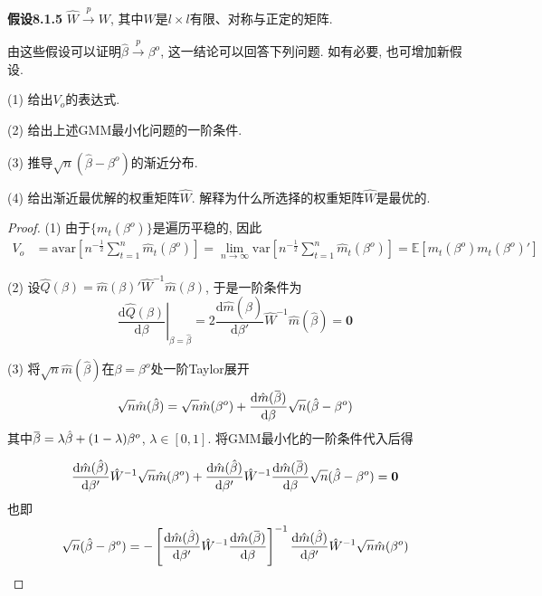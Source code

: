 \documentclass[cn,12pt,math=mtpro2,citestyle=gb7714-2015,bibstyle=gb7714-2015,twocol,mode=simple]{elegantbook}
\newcommand{\overbar}[1]{\mkern 1.5mu\overline{\mkern-1.5mu#1\mkern-1.5mu}\mkern 1.5mu}
\newcommand{\E}{\mathbb{E}}
\newcommand{\var}{\text{var}}
\newcommand{\hbeta}{\hat{\beta}}
\newcommand{\hatm}{\hat{m}}
\begin{document}
\textbf{假设8.1.5} $\hat{W}\xrightarrow{p} W$, 其中$W$是$l\times l$有限、对称与正定的矩阵.

由这些假设可以证明$\hat{\beta}\xrightarrow{p}\beta^o$, 这一结论可以回答下列问题. 如有必要, 也可增加新假设.

(1) 给出$V_o$的表达式.

(2) 给出上述GMM最小化问题的一阶条件.

(3) 推导$\sqrt{n}(\hat{\beta}-\beta^o)$的渐近分布.

(4) 给出渐近最优解的权重矩阵$\hat{W}$. 解释为什么所选择的权重矩阵$\hat{W}$是最优的.

\begin{proof}
  (1) 由于$\{m_t(\beta^o)\}$是遍历平稳的, 因此
  \begin{align*}
  V_o&=\text{avar}\left[n^{-\frac{1}{2}}\sum_{t=1}^{n}\hatm_t(\beta^o)\right]=\lim_{n\to\infty}\var\left[n^{-\frac{1}{2}}\sum_{t=1}^{n} \hatm_t(\beta^o)\right]=\E[m_t(\beta^o)m_t(\beta^o)']
  \end{align*}

  (2) 设$\hat{Q}(\beta)=\hat{m}(\beta)'\hat{W}^{-1}\hat{m}(\beta)$, 于是一阶条件为
  $$\left.\frac{\text{d}\hat{Q}(\beta)}{\text{d}\beta}\right|_{\beta=\hat{\beta}}=2\frac{\text{d}\hat{m}(\hbeta)}{\text{d}\beta'}\hat{W}^{-1}\hat{m}(\hbeta)=\mathbf{0}$$

  (3) 将$\sqrt{n}\hat{m}(\hbeta)$在$\beta=\beta^o$处一阶Taylor展开
  $$\sqrt{n}\hat{m}(\hbeta)=\sqrt{n}\hatm(\beta^o)+\frac{\text{d}\hatm(\overbar{\beta})}{\text{d}\beta}\sqrt{n}(\hat{\beta}-\beta^o)$$
  其中$\overbar{\beta}=\lambda\hbeta+(1-\lambda)\beta^o$, $\lambda\in[0,1]$. 将GMM最小化的一阶条件代入后得

  $$\frac{\text{d}\hat{m}(\hbeta)}{\text{d}\beta'}\hat{W}^{-1}\sqrt{n}\hatm(\beta^o)+\frac{\text{d}\hat{m}(\hbeta)}{\text{d}\beta'}\hat{W}^{-1}\frac{\text{d}\hatm(\overbar{\beta})}{\text{d}\beta}\sqrt{n}(\hat{\beta}-\beta^o)=\mathbf{0}$$
  也即
  $$\sqrt{n}(\hbeta-\beta^o)=-\left[\frac{\text{d}\hatm(\hbeta)}{\text{d}\beta'}\hat{W}^{-1}\frac{\text{d}\hatm(\overbar{\beta})}{\text{d}\beta}\right]^{-1}\frac{\text{d}\hat{m}(\hbeta)}{\text{d}\beta'}\hat{W}^{-1}\sqrt{n}\hatm(\beta^o)$$


\end{proof}
\end{document}
